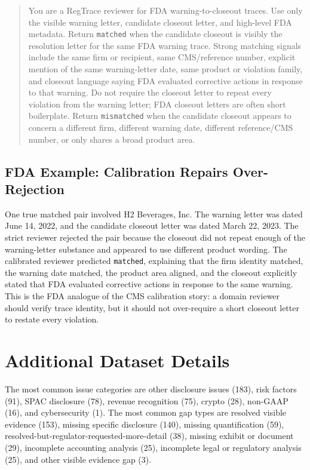 \documentclass[11pt]{article}
\begin{document}
\begin{quote}\small
You are a RegTrace reviewer for FDA warning-to-closeout traces. Use only the visible warning letter, candidate closeout letter, and high-level FDA metadata. Return \texttt{matched} when the candidate closeout is visibly the resolution letter for the same FDA warning trace. Strong matching signals include the same firm or recipient, same CMS/reference number, explicit mention of the same warning-letter date, same product or violation family, and closeout language saying FDA evaluated corrective actions in response to that warning. Do not require the closeout letter to repeat every violation from the warning letter; FDA closeout letters are often short boilerplate. Return \texttt{mismatched} when the candidate closeout appears to concern a different firm, different warning date, different reference/CMS number, or only shares a broad product area.
\end{quote}

\subsection{FDA Example: Calibration Repairs Over-Rejection}

One true matched pair involved H2 Beverages, Inc. The warning letter was dated June 14, 2022, and the candidate closeout letter was dated March 22, 2023. The strict reviewer rejected the pair because the closeout did not repeat enough of the warning-letter substance and appeared to use different product wording. The calibrated reviewer predicted \texttt{matched}, explaining that the firm identity matched, the warning date matched, the product area aligned, and the closeout explicitly stated that FDA evaluated corrective actions in response to the same warning. This is the FDA analogue of the CMS calibration story: a domain reviewer should verify trace identity, but it should not over-require a short closeout letter to restate every violation.

\section{Additional Dataset Details}
\label{app:data}

The most common issue categories are other disclosure issues (183), risk factors (91), SPAC disclosure (78), revenue recognition (75), crypto (28), non-GAAP (16), and cybersecurity (1). The most common gap types are resolved visible evidence (153), missing specific disclosure (140), missing quantification (59), resolved-but-regulator-requested-more-detail (38), missing exhibit or document (29), incomplete accounting analysis (25), incomplete legal or regulatory analysis (25), and other visible evidence gap (3).
\end{document}
